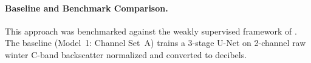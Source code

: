 \documentclass{article}
\begin{document}




\paragraph{Baseline and Benchmark Comparison.}
This approach was benchmarked against the weakly supervised framework of \citet{briand2026weakly}. The baseline (Model~1: Channel Set~A) trains a 3-stage U-Net \citep{ronneberger2015unet} on 2-channel raw winter C-band backscatter normalized and converted to decibels.
\end{document}
